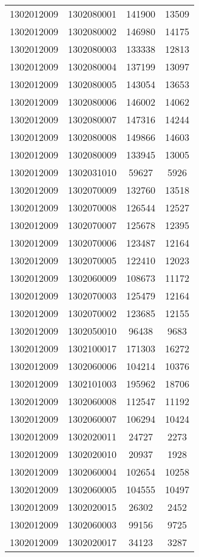 \begin{longtable}[h]{llcc}
		1302012009 & 1302080001 & 141900 & 13509\\
		1302012009 & 1302080002 & 146980 & 14175\\
		1302012009 & 1302080003 & 133338 & 12813\\
		1302012009 & 1302080004 & 137199 & 13097\\
		1302012009 & 1302080005 & 143054 & 13653\\
		1302012009 & 1302080006 & 146002 & 14062\\
		1302012009 & 1302080007 & 147316 & 14244\\
		1302012009 & 1302080008 & 149866 & 14603\\
		1302012009 & 1302080009 & 133945 & 13005\\
		1302012009 & 1302031010 & 59627 & 5926\\
		1302012009 & 1302070009 & 132760 & 13518\\
		1302012009 & 1302070008 & 126544 & 12527\\
		1302012009 & 1302070007 & 125678 & 12395\\
		1302012009 & 1302070006 & 123487 & 12164\\
		1302012009 & 1302070005 & 122410 & 12023\\
		1302012009 & 1302060009 & 108673 & 11172\\
		1302012009 & 1302070003 & 125479 & 12164\\
		1302012009 & 1302070002 & 123685 & 12155\\
		1302012009 & 1302050010 & 96438 & 9683\\
		1302012009 & 1302100017 & 171303 & 16272\\
		1302012009 & 1302060006 & 104214 & 10376\\
		1302012009 & 1302101003 & 195962 & 18706\\
		1302012009 & 1302060008 & 112547 & 11192\\
		1302012009 & 1302060007 & 106294 & 10424\\
		1302012009 & 1302020011 & 24727 & 2273\\
		1302012009 & 1302020010 & 20937 & 1928\\
		1302012009 & 1302060004 & 102654 & 10258\\
		1302012009 & 1302060005 & 104555 & 10497\\
		1302012009 & 1302020015 & 26302 & 2452\\
		1302012009 & 1302060003 & 99156 & 9725\\
		1302012009 & 1302020017 & 34123 & 3287\\

\end{longtable}
